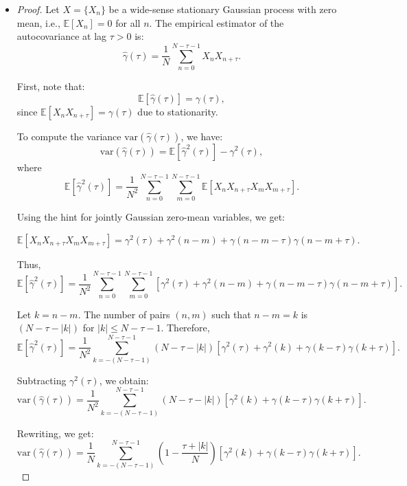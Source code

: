 \documentclass[11pt]{article}
\begin{document}
\begin{solution} %
    \begin{itemize}
        \item \begin{proof}
    Let $X = \{X_n\}$ be a wide-sense stationary Gaussian process with zero mean, i.e., $\mathbb{E}[X_n] = 0$ for all $n$. The empirical estimator of the autocovariance at lag $\tau > 0$ is:
    \[
    \hat{\gamma}(\tau) = \frac{1}{N} \sum_{n=0}^{N-\tau-1} X_n X_{n+\tau}.
    \]
    
    First, note that:
    \[
    \mathbb{E}[\hat{\gamma}(\tau)] = \gamma(\tau),
    \]
    since $\mathbb{E}[X_n X_{n+\tau}] = \gamma(\tau)$ due to stationarity.
    
    To compute the variance $\text{var}(\hat{\gamma}(\tau))$, we have:
    \[
    \text{var}(\hat{\gamma}(\tau)) = \mathbb{E}[\hat{\gamma}^2(\tau)] - \gamma^2(\tau),
    \]
    where
    \[
    \mathbb{E}[\hat{\gamma}^2(\tau)] = \frac{1}{N^2} \sum_{n=0}^{N-\tau-1} \sum_{m=0}^{N-\tau-1} \mathbb{E}[X_n X_{n+\tau} X_m X_{m+\tau}].
    \]
    
    Using the hint for jointly Gaussian zero-mean variables, we get:
    
    \[
    \mathbb{E}[X_n X_{n+\tau} X_m X_{m+\tau}] = \gamma^2(\tau) + \gamma^2(n - m) + \gamma(n - m - \tau) \gamma(n - m + \tau).
    \]
    
    Thus,
    \[
    \mathbb{E}[\hat{\gamma}^2(\tau)] = \frac{1}{N^2} \sum_{n=0}^{N-\tau-1} \sum_{m=0}^{N-\tau-1} \left[ \gamma^2(\tau) + \gamma^2(n - m) + \gamma(n - m - \tau)\gamma(n - m + \tau) \right].
    \]
    
    Let $k = n - m$. The number of pairs $(n, m)$ such that $n - m = k$ is $(N - \tau - |k|)$ for $|k| \leq N - \tau - 1$. Therefore,
    \[
    \mathbb{E}[\hat{\gamma}^2(\tau)] = \frac{1}{N^2} \sum_{k=-(N-\tau-1)}^{N-\tau-1} (N - \tau - |k|) \left[ \gamma^2(\tau) + \gamma^2(k) + \gamma(k - \tau)\gamma(k + \tau) \right].
    \]
    
    Subtracting $\gamma^2(\tau)$, we obtain:
    \[
    \text{var}(\hat{\gamma}(\tau)) = \frac{1}{N^2} \sum_{k=-(N-\tau-1)}^{N-\tau-1} (N - \tau - |k|) \left[ \gamma^2(k) + \gamma(k - \tau)\gamma(k + \tau) \right].
    \]
    
    Rewriting, we get:
    \[
    \text{var}(\hat{\gamma}(\tau)) = \frac{1}{N} \sum_{k=-(N-\tau-1)}^{N-\tau-1} \left(1 - \frac{\tau + |k|}{N}\right) \left[ \gamma^2(k) + \gamma(k - \tau)\gamma(k + \tau) \right].
    \]
    

\end{proof}
\end{itemize}
\end{solution}
\end{document}
